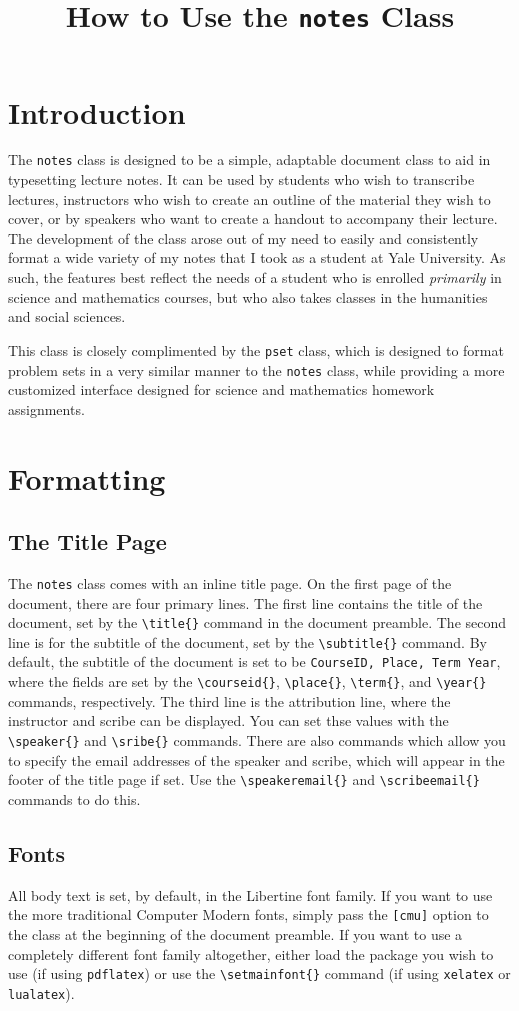 \documentclass[diagram]{notes}
\title{How to Use the \texttt{notes} Class}
\begin{document}
\section{Introduction}
The \texttt{notes} class is designed to be a simple, adaptable document class to aid in typesetting lecture notes. It can be used by students who wish to transcribe lectures, instructors who wish to create an outline of the material they wish to cover, or by speakers who want to create a handout to accompany their lecture. The development of the class arose out of my need to easily and consistently format a wide variety of my notes that I took as a student at Yale University. As such, the features best reflect the needs of a student who is enrolled \emph{primarily} in science and mathematics courses, but who also takes classes in the humanities and social sciences.

This class is closely complimented by the \texttt{pset} class, which is designed to format problem sets in a very similar manner to the \texttt{notes} class, while providing a more customized interface designed for science and mathematics homework assignments.

\section{Formatting}
\subsection{The Title Page}
The \texttt{notes} class comes with an inline title page. On the first page of the document, there are four primary lines. The first line contains the title of the document, set by the \verb|\title{}| command in the document preamble. The second line is for the subtitle of the document, set by the \verb|\subtitle{}| command. By default, the subtitle of the document is set to be \verb|CourseID, Place, Term Year|, where the fields are set by the \verb|\courseid{}|, \verb|\place{}|, \verb|\term{}|, and \verb|\year{}| commands, respectively. The third line is the attribution line, where the instructor and scribe can be displayed. You can set thse values with the \verb|\speaker{}| and \verb|\sribe{}| commands. There are also commands which allow you to specify the email addresses of the speaker and scribe, which will appear in the footer of the title page if set. Use the \verb|\speakeremail{}| and \verb|\scribeemail{}| commands to do this.

\subsection{Fonts}
All body text is set, by default, in the Libertine font family. If you want to use the more traditional Computer Modern fonts, simply pass the \verb|[cmu]| option to the class at the beginning of the document preamble. If you want to use a completely different font family altogether, either load the package you wish to use (if using \texttt{pdflatex}) or use the \verb|\setmainfont{}| command (if using \texttt{xelatex} or \texttt{lualatex}).
\end{document}
